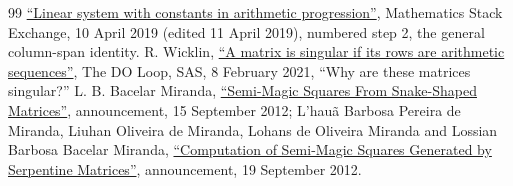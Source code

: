 \documentclass[11pt]{article}
\begin{document}
\begin{thebibliography}{99}
\href{https://math.stackexchange.com/a/3182097}{``Linear system with constants in arithmetic progression''},
Mathematics Stack Exchange, 10 April 2019 (edited 11 April 2019),
numbered step 2, the general column-span identity.
 R. Wicklin,
\href{https://blogs.sas.com/content/iml/2021/02/08/matrix-singular-rows-arithmetic-sequences.html}{``A matrix is singular if its rows are arithmetic sequences''},
The DO Loop, SAS, 8 February 2021, ``Why are these matrices singular?''
 L. B. Bacelar Miranda,
\href{https://pyaugohy.blogspot.com/2012/09/semi-magic-squares-from-snake-shaped.html}{``Semi-Magic Squares From Snake-Shaped Matrices''},
announcement, 15 September 2012; L'hau\~a Barbosa Pereira de Miranda,
Liuhan Oliveira de Miranda, Lohans de Oliveira Miranda and
Lossian Barbosa Bacelar Miranda,
\href{https://pyaugohy.blogspot.com/2012/09/computation-of-semi-magic-squares.html}{``Computation of Semi-Magic Squares Generated by Serpentine Matrices''},
announcement, 19 September 2012.
\end{thebibliography}
\end{document}
